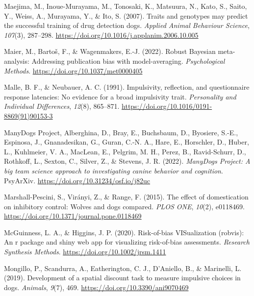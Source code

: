 \documentclass[
  ,pub,floatsintext]{apa6}
\newlength{\cslhangindent}
\newlength{\cslentryspacingunit} %
\newenvironment{CSLReferences}[2] %
 {%
  \setlength{\parindent}{0pt}
  \ifodd #1
  \let\oldpar\par
  \def\par{\hangindent=\cslhangindent\oldpar}
  \fi
  \setlength{\parskip}{#2\cslentryspacingunit}
 }%
 {}
\begin{document}
\begin{CSLReferences}{1}{0}
\leavevmode{}%
Maejima, M., Inoue-Murayama, M., Tonosaki, K., Matsuura, N., Kato, S., Saito, Y., Weiss, A., Murayama, Y., \& Ito, S. (2007). Traits and genotypes may predict the successful training of drug detection dogs. \emph{Applied Animal Behaviour Science}, \emph{107}(3), 287--298. \url{https://doi.org/10.1016/j.applanim.2006.10.005}

\leavevmode{}%
Maier, M., Bartoš, F., \& Wagenmakers, E.-J. (2022). Robust {Bayesian} meta-analysis: {Addressing} publication bias with model-averaging. \emph{Psychological Methods}. \url{https://doi.org/10.1037/met0000405}

\leavevmode{}%
Malle, B. F., \& Neubauer, A. C. (1991). Impulsivity, reflection, and questionnaire response latencies: {No} evidence for a broad impulsivity trait. \emph{Personality and Individual Differences}, \emph{12}(8), 865--871. \url{https://doi.org/10.1016/0191-8869(91)90153-3}

\leavevmode{}%
ManyDogs Project, Alberghina, D., Bray, E., Buchsbaum, D., Byosiere, S.-E., Espinosa, J., Gnanadesikan, G., Guran, C.-N. A., Hare, E., Horschler, D., Huber, L., Kuhlmeier, V. A., MacLean, E., Pelgrim, M. H., Perez, B., Ravid-Schurr, D., Rothkoff, L., Sexton, C., Silver, Z., \& Stevens, J. R. (2022). \emph{{ManyDogs Project}: {A} big team science approach to investigating canine behavior and cognition}. {PsyArXiv}. \url{https://doi.org/10.31234/osf.io/j82uc}

\leavevmode{}%
Marshall-Pescini, S., Virányi, Z., \& Range, F. (2015). The effect of domestication on inhibitory control: Wolves and dogs compared. \emph{PLOS ONE}, \emph{10}(2), e0118469. \url{https://doi.org/10.1371/journal.pone.0118469}

\leavevmode{}%
McGuinness, L. A., \& Higgins, J. P. (2020). Risk-of-bias VISualization (robvis): An r package and shiny web app for visualizing risk-of-bias assessments. \emph{Research Synthesis Methods}. \url{https://doi.org/10.1002/jrsm.1411}

\leavevmode{}%
Mongillo, P., Scandurra, A., Eatherington, C. J., D'Aniello, B., \& Marinelli, L. (2019). Development of a spatial discount task to measure impulsive choices in dogs. \emph{Animals}, \emph{9}(7), 469. \url{https://doi.org/10.3390/ani9070469}


\end{CSLReferences}
\end{document}
